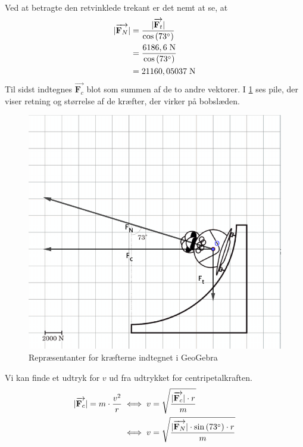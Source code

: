 \documentclass{report}
\begin{document}
Ved at betragte den retvinklede trekant er det nemt at se, at
\begin{equation*}
\begin{split}
  |\overrightarrow{\textbf{F}_N}|&=\frac{|\overrightarrow{\textbf{F}_t}|}{\cos\left(73 \degree \right) }\\
  &=\frac{6186,6 \;\unit{N} }{\cos\left(73 \degree  \right) }\\
  &=21160,05037 \;\unit{N} 
\end{split}
\end{equation*}
Til sidst indtegnes $\overrightarrow{\textbf{F}_c} $ blot som summen af de to andre vektorer. 
I \cref{fig:bob} ses pile, der viser retning og størrelse af de kræfter, der virker på bobslæden.
\begin{figure}[H]
\begin{center}
  \includegraphics[scale=0.5]{bobslæde.png}
\end{center}
\caption{Repræsentanter for kræfterne indtegnet i GeoGebra}
\label{fig:bob}
\end{figure}
Vi kan finde et udtryk for $v$ ud fra udtrykket for centripetalkraften. 
\begin{equation*}
\begin{split}
  |\overrightarrow{\textbf{F}_c}|=m \cdot \frac{v^2}{r} &\iff v=\sqrt{\frac{|\overrightarrow{\textbf{F}_c}| \cdot r}{m}} \\
  &\iff v=\sqrt{\frac{|\overrightarrow{\textbf{F}_N}| \cdot \sin\left(73 \degree \right) \cdot r}{m}} 
\end{split}
\end{equation*}
\end{document}
